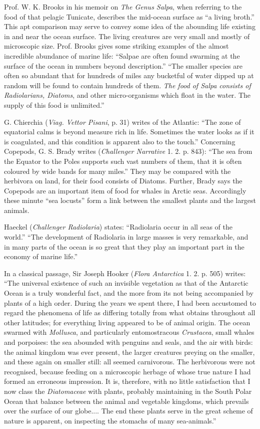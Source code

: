 \documentclass[a4paper, 12pt, oneside]{article}
\begin{document}
Prof. W. K. Brooks in his memoir on \emph{The Genus Salpa}, when referring to the food of that pelagic Tunicate, describes the mid-ocean surface as ``a living broth.'' This apt comparison may serve to convey some idea of the abounding life existing in and near the ocean surface. The living creatures are very small and mostly of microscopic size. Prof. Brooks gives some striking examples of the almost incredible abundance of marine life: ``Salpae are often found swarming at the surface of the ocean in numbers beyond description.'' ``The smaller species are often so abundant that for hundreds of miles any bucketful of water dipped up at random will be found to contain hundreds of them. \emph{The food of Salpa consists of Radiolarians, Diatoms}, and other micro-organisms which float in the water. The supply of this food is unlimited.'' 

G. Chierchia (\emph{Viag. Vettor Pisani}, p. 31) writes of the Atlantic: ``The zone of equatorial calms is beyond measure rich in life. Sometimes the water looks as if it is coagulated, and this condition is apparent also to the touch.'' Concerning Copepods, G. S. Brady writes (\emph{Challenger Narrative} 1. 2. p. 843): ``The sea from the Equator to the Poles supports such vast numbers of them, that it is often coloured by wide bands for many miles.'' They may be compared with the herbivora on land, for their food consists of Diatoms. Further, Brady says the Copepods are an important item of food for whales in Arctic seas. Accordingly these minute ``sea locusts'' form a link between the smallest plants and the largest animals. 

Haeckel (\emph{Challenger Radiolaria}) states: ``Radiolaria occur in all seas of the world.'' ``The development of Radiolaria in large masses is very remarkable, and in many parts of the ocean is so great that they play an important part in the economy of marine life.'' 

In a classical passage, Sir Joseph Hooker (\emph{Flora Antarctica} 1. 2. p. 505) writes: ``The universal existence of such an invisible vegetation as that of the Antarctic Ocean is a truly wonderful fact, and the more from its not being accompanied by plants of a high order. During the years we spent there, I had been accustomed to regard the phenomena of life as differing totally from what obtains throughout all other latitudes; for everything living appeared to be of animal origin. The ocean swarmed with \emph{Mollusca}, and particularly entomostracous \emph{Crustacea}, small whales and porpoises: the sea abounded with penguins and seals, and the air with birds: the animal kingdom was ever present, the larger creatures preying on the smaller, and these again on smaller still: all seemed carnivorous. The herbivorous were not recognised, because feeding on a microscopic herbage of whose true nature I had formed an erroneous impression. It is, therefore, with no little satisfaction that I now class the \emph{Diatomaceae} with plants, probably maintaining in the South Polar Ocean that balance between the animal and vegetable kingdoms, which prevails over the surface of our globe.... The end these plants serve in the great scheme of nature is apparent, on inspecting the stomachs of many sea-animals.''
\end{document}
